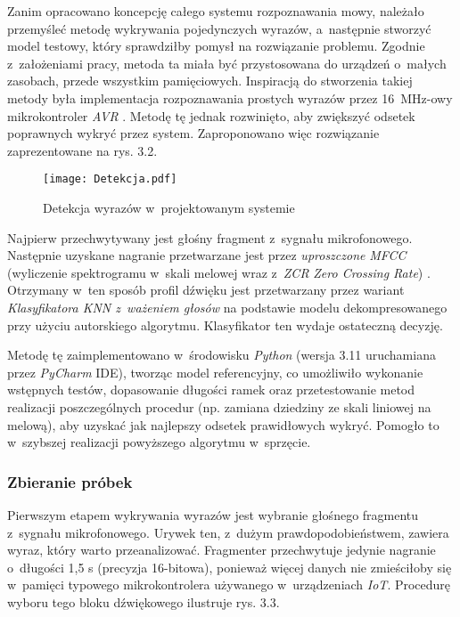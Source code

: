 Zanim opracowano koncepcję całego systemu rozpoznawania mowy, należało przemyśleć metodę wykrywania pojedynczych wyrazów, a~następnie stworzyć model testowy, który sprawdziłby pomysł na rozwiązanie problemu. Zgodnie z~założeniami pracy, metoda ta miała być przystosowana do urządzeń o~małych zasobach, przede wszystkim pamięciowych. Inspiracją do stworzenia takiej metody była implementacja rozpoznawania prostych wyrazów przez 16~MHz-owy mikrokontroler \textit{AVR} \cite{SpeechArduino}. Metodę tę jednak rozwinięto, aby zwiększyć odsetek poprawnych wykryć przez system. Zaproponowano więc rozwiązanie zaprezentowane na rys. 3.2.

\begin{figure}[h]
	\centering
	\texttt{[image: Detekcja.pdf]}
	\caption{Detekcja wyrazów w~projektowanym systemie}
\end{figure}
\FloatBarrier %

Najpierw przechwytywany jest głośny fragment z~sygnału mikrofonowego. Następnie uzyskane nagranie przetwarzane jest przez \textit{uproszczone} \textit{MFCC} (wyliczenie spektrogramu w~skali melowej wraz z~\textit{ZCR} \textit{Zero Crossing Rate}) \cite{Wiki:ZCR}. Otrzymany w~ten sposób profil dźwięku jest przetwarzany przez wariant \textit{Klasyfikatora KNN z~ważeniem głosów} na podstawie modelu dekompresowanego przy użyciu autorskiego algorytmu. Klasyfikator ten wydaje ostateczną decyzję.

Metodę tę zaimplementowano w~środowisku \textit{Python} (wersja 3.11 uruchamiana przez \textit{PyCharm} IDE), tworząc model referencyjny, co umożliwiło wykonanie wstępnych testów, dopasowanie długości ramek oraz przetestowanie metod realizacji poszczególnych procedur (np. zamiana dziedziny ze skali liniowej na melową), aby uzyskać jak najlepszy odsetek prawidłowych wykryć. Pomogło to w~szybszej realizacji powyższego algorytmu w~sprzęcie.




\subsubsection{Zbieranie próbek}

Pierwszym etapem wykrywania wyrazów jest wybranie głośnego fragmentu z~sygnału mikrofonowego. Urywek ten, z~dużym prawdopodobieństwem, zawiera wyraz, który warto przeanalizować. Fragmenter przechwytuje jedynie nagranie o~długości 1,5 s (precyzja 16-bitowa), ponieważ więcej danych nie zmieściłoby się w~pamięci typowego mikrokontrolera używanego w~urządzeniach \textit{IoT}. Procedurę wyboru tego bloku dźwiękowego ilustruje rys. 3.3.

